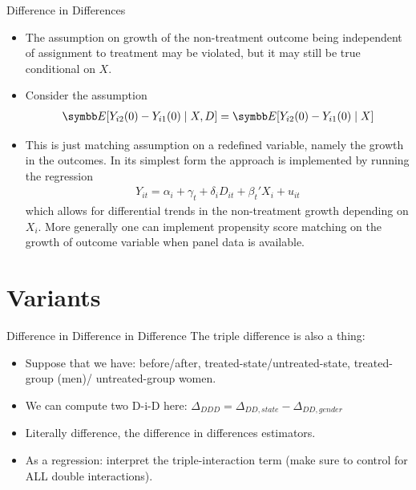 \documentclass[aspectratio=169,11pt]{beamer}
\begin{document}
\begin{frame}{Difference in Differences}
\begin{itemize}
\item The assumption on growth of the non-treatment outcome being independent of assignment to treatment may be violated, but it may still be true conditional on $X$.
\item Consider the assumption
\begin{align*}
\E[Y_{i2}(0)- Y_{i1}(0) \mid X,D] = \E[Y_{i2}(0)- Y_{i1}(0) \mid X]
\end{align*}
\item This is just matching assumption on a redefined variable, namely the growth in the outcomes. In its simplest form the approach is implemented by running the regression
\begin{align*}
Y_{it} = \alpha_i + \gamma_t + \delta_i D_{it} + \beta_t' X_i + u_{it}
\end{align*}
which allows for differential trends in the non-treatment growth depending on $X_i$. More generally one can implement propensity score matching on the growth of outcome variable when panel data is available.
\end{itemize}
\end{frame}

\section{Variants}

\begin{frame}{Difference in Difference in Difference}
The triple difference is also a thing:
\begin{itemize}
\item Suppose that we have: before/after, treated-state/untreated-state, treated-group (men)/ untreated-group women.
\item We can compute two D-i-D here: $\Delta_{DDD} = \Delta_{DD,state} - \Delta_{DD,gender}$ 
\item Literally difference, the difference in differences estimators.
\item As a regression: interpret the triple-interaction term (make sure to control for ALL double interactions).
\end{itemize}
\end{frame}
\end{document}
